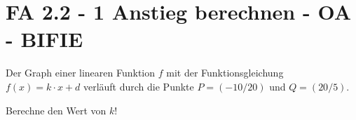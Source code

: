 \section{FA 2.2 - 1 Anstieg berechnen - OA - BIFIE}

\begin{beispiel}[FA 2.2]{1} %
Der Graph einer linearen Funktion $f$ mit der Funktionsgleichung $f(x)=k\cdot x+d$ verläuft durch die Punkte $P=(-10/20)$ und $Q=(20/5)$.

Berechne den Wert von $k$!
\leer

\end{beispiel}